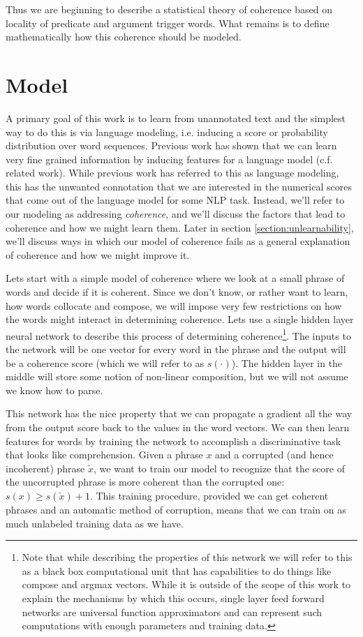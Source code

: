 \documentclass[11pt,letterpaper]{article}
\begin{document}
Thus we are beginning to describe a statistical theory of coherence
based on locality of predicate and argument trigger words.
What remains is to define mathematically how this coherence should be modeled.


\section{Model} %
A primary goal of this work is to learn from unannotated text and
the simplest way to do this is via language modeling, i.e. inducing
a score or probability distribution over word sequences.
Previous work has shown that we can learn very fine grained information
by inducing features for a language model (c.f. related work).
While previous work has referred to this as language modeling,
this has the unwanted connotation that we are interested in the
numerical scores that come out of the language model for some NLP task.
Instead, we'll refer to our modeling as addressing {\em coherence},
and we'll discuss the factors that lead to coherence and how we might learn them. 
Later in section \ref{section:unlearnability}, we'll discuss ways in which our model of coherence
fails as a general explanation of coherence and how we might improve it.

Lets start with a simple model of coherence where we look at a small phrase of words
and decide if it is coherent. Since we don't know, or rather want to learn, how words
collocate and compose, we will impose very few restrictions on how the words might
interact in determining coherence. Lets use a single hidden layer neural network to
describe this process of determining coherence\footnote{Note that while describing
the properties of this network we will refer to this as a black box computational
unit that has capabilities to do things like compose and argmax vectors.
While it is outside of the scope of this work to explain the mechanisms by which this
occurs, single layer feed forward networks are universal function approximators \cite{Hornik:1989}
and can represent such computations with enough parameters and training data.
}.
The inputs to the network will be one
vector for every word in the phrase and the output will be a coherence score
(which we will refer to as $s(\cdot)$).
The hidden layer in the middle will store some notion of non-linear composition,
but we will not assume we know how to parse.

This network has the nice property that we can propagate a gradient all the
way from the output score back to the values in the word vectors.
We can then learn features for words by training the network to accomplish
a discriminative task that looks like comprehension.
Given a phrase $x$ and a corrupted (and hence incoherent) phrase $\tilde{x}$,
we want to train our model to recognize that the score of the uncorrupted phrase
is more coherent than the corrupted one: $s(x) \ge s(\tilde{x}) + 1$.
This training procedure, provided we can get coherent phrases and an automatic method of
corruption, means that we can train on as much unlabeled training data as we have.
\end{document}
